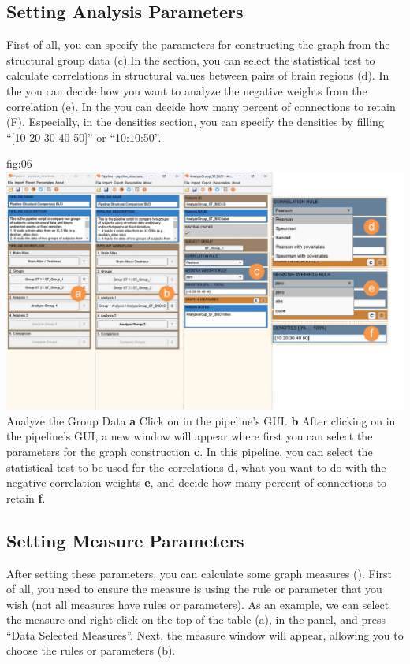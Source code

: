 \documentclass[justified]{tufte-handout}
\begin{document}
\subsection{Setting Analysis Parameters}


First of all, you can specify the parameters for constructing the graph from the structural group data (c).In the  section, you can select the statistical test to calculate correlations in structural values between pairs of brain regions (d).
In the  you can decide how you want to analyze the negative weights from the correlation (e). 
In the  you can decide how many percent of connections to retain (F). Especially, in the densities section, you can specify the densities by filling “[10 20 30 40 50]” or “10:10:50”.

	{fig:06}
	{\includegraphics{fig06.jpg}}
	{Analyze the Group Data}
	{
	{\bf a} Click on  in the pipeline's GUI.
        {\bf b} After clicking on  in the pipeline's GUI, a new window will appear where first you can select the parameters for the graph construction {\bf c}. In this pipeline, you can select the statistical test to be used for the correlations {\bf d}, what you want to do with the negative correlation weights {\bf e}, and decide how many percent of connections to retain {\bf f}.
	}

 
\subsection{Setting Measure Parameters}

 After setting these parameters, you can calculate some graph measures (). First of all, you need to ensure the measure is using the rule or parameter that you wish (not all measures have rules or parameters). As an example, we can select the measure  and right-click on the top of the table (a), in the  panel, and press “Data Selected Measures”. 
 Next, the measure window will appear, allowing you to choose the rules or parameters (b). 
 
\end{document}
